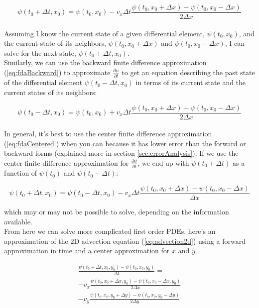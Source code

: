 {   \begin{equation}\label{eq:advection1Dapprox}
  \psi(t_{0} + \Delta  t,  x_{0}) = \psi(t_{0}, x_{0})-v_{x}\Delta t \frac{\psi(t_{0}, x_{0} + \Delta  x)-\psi(t_{0}, x_{0}-\Delta x)}{2\Delta  x}
  \end{equation}
\\
Assuming I know the current state of a given differential element, $\psi(t_{0}, x_{0})$, and the current state of its neighbors, $\psi(t_{0}, x_{0}+\Delta x)$ and $\psi(t_{0}, x_{0}-\Delta x)$, I can solve for the next state, $\psi(t_{0}+\Delta t, x_{0})$.\\

Similarly, we can use the backward finite difference approximation (\ref{eq:fdaBackward}) to approximate $\frac{\partial \psi}{\partial t}$ to get an equation describing the past state of the differential element $\psi(t_{0}-\Delta t, x_{0})$ in terms of its current state and the current states of its neighbors:

  \begin{equation}
  \psi(t_{0} - \Delta  t,  x_{0}) = \psi(t_{0}, x_{0}) + v_{x}\Delta t \frac{\psi(t_{0}, x_{0} + \Delta  x)-\psi(t_{0}, x_{0}-\Delta x)}{2\Delta  x}
  \end{equation}
  \\
  In general, it's best to use the center finite difference approximation (\ref{eq:fdaCentered}) when you can because it has lower error than the forward or backward forms (explained more in section \ref{sec:errorAnalysis}).  If we use the center finite difference approximation for $\frac{\partial \psi}{\partial t}$, we end up with $\psi(t_{0}+\Delta t)$ as a function of $\psi(t_{0})$ and $\psi(t_{0}-\Delta t)$:
  
     \begin{equation}
  \psi(t_{0} + \Delta  t,  x_{0}) = \psi(t_{0}-\Delta t, x_{0}) -v_{x}\Delta t \frac{\psi(t_{0}, x_{0} + \Delta  x)-\psi(t_{0}, x_{0}-\Delta x)}{\Delta  x}
  \end{equation}
  
  which may or may not be possible to solve, depending on the information available.\\
  
  From here we can solve more complicated first order PDEs, here's an approximation of the 2D advection equation (\ref{eq:advection2d}) using a forward approximation in time and a center approximation for $x$ and $y$.
  
\begin{multline}
   \frac{ \psi(t_{0} + \Delta  t,  x_{0}, y_{0}) - \psi(t_{0}, x_{0}, y_{0})}{\Delta t} = \\
   -v_{x}\frac{\psi(t_{0}, x_{0} + \Delta  x, y_{0})-\psi(t_{0}, x_{0}-\Delta x, y_{0})}{2\Delta  x}\\
   -v_{y}\frac{\psi(t_{0}, x_{0}, y_{0} + \Delta  y)-\psi(t_{0}, x_{0}, y_{0}-\Delta y)}{2\Delta  y}
\end{multline}

}
